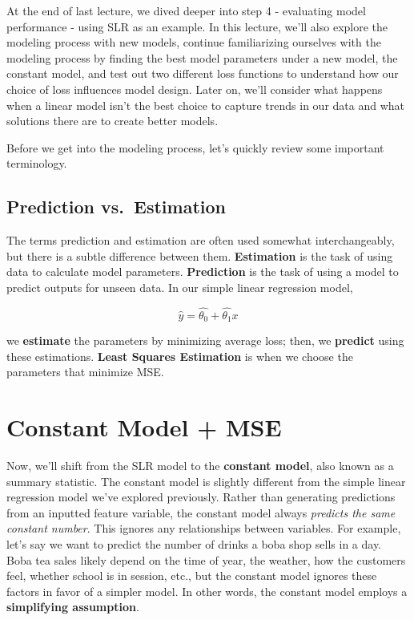 \documentclass[
  letterpaper,
  DIV=11,
  numbers=noendperiod]{scrreprt}
\begin{document}
At the end of last lecture, we dived deeper into step 4 - evaluating
model performance - using SLR as an example. In this lecture, we'll also
explore the modeling process with new models, continue familiarizing
ourselves with the modeling process by finding the best model parameters
under a new model, the constant model, and test out two different loss
functions to understand how our choice of loss influences model design.
Later on, we'll consider what happens when a linear model isn't the best
choice to capture trends in our data and what solutions there are to
create better models.

Before we get into the modeling process, let's quickly review some
important terminology.

\subsection{Prediction vs.~Estimation}\label{prediction-vs.-estimation}

The terms prediction and estimation are often used somewhat
interchangeably, but there is a subtle difference between them.
\textbf{Estimation} is the task of using data to calculate model
parameters. \textbf{Prediction} is the task of using a model to predict
outputs for unseen data. In our simple linear regression model,

\[\hat{y} = \hat{\theta_0} + \hat{\theta_1}x\]

we \textbf{estimate} the parameters by minimizing average loss; then, we
\textbf{predict} using these estimations. \textbf{Least Squares
Estimation} is when we choose the parameters that minimize MSE.

\section{Constant Model + MSE}\label{constant-model-mse}

Now, we'll shift from the SLR model to the \textbf{constant model}, also
known as a summary statistic. The constant model is slightly different
from the simple linear regression model we've explored previously.
Rather than generating predictions from an inputted feature variable,
the constant model always \emph{predicts the same constant number}. This
ignores any relationships between variables. For example, let's say we
want to predict the number of drinks a boba shop sells in a day. Boba
tea sales likely depend on the time of year, the weather, how the
customers feel, whether school is in session, etc., but the constant
model ignores these factors in favor of a simpler model. In other words,
the constant model employs a \textbf{simplifying assumption}.
\end{document}
